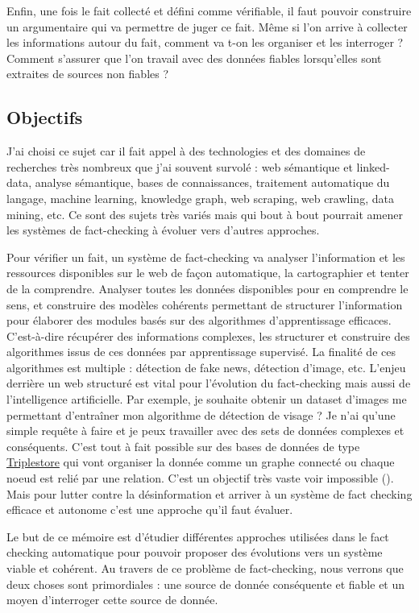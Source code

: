 Enfin, une fois le fait collecté et défini comme vérifiable, il faut pouvoir construire un argumentaire qui va permettre de juger ce fait. Même si l'on arrive à collecter les informations autour du fait, comment va t-on les organiser et les interroger ? Comment s'assurer que l'on travail avec des données fiables lorsqu'elles sont extraites de sources non fiables ? 

\subsection{Objectifs}

J'ai choisi ce sujet car il fait appel à des technologies et des domaines de recherches très nombreux que j'ai souvent survolé : web sémantique et linked-data, analyse sémantique, bases de connaissances, traitement automatique du langage, machine learning, knowledge graph, web scraping, web crawling, data mining, etc. Ce sont des sujets très variés mais qui bout à bout pourrait amener les systèmes de fact-checking à évoluer vers d'autres approches. 

Pour vérifier un fait, un système de fact-checking va analyser l'information et les ressources disponibles sur le web de façon automatique, la cartographier et tenter de la comprendre. Analyser toutes les données disponibles pour en comprendre le sens, et construire des modèles cohérents permettant de structurer l'information pour élaborer des modules basés sur des algorithmes d'apprentissage efficaces. C'est-à-dire récupérer des informations complexes, les structurer et construire des algorithmes issus de ces données par apprentissage supervisé. La finalité de ces algorithmes est multiple : détection de fake news, détection d'image, etc. L'enjeu derrière un web structuré est vital pour l'évolution du fact-checking mais aussi de l'intelligence artificielle. Par exemple, je souhaite obtenir un dataset d'images me permettant d'entraîner mon algorithme de détection de visage ? Je n'ai qu'une simple requête à faire et je peux travailler avec des sets de données complexes et conséquents. C'est tout à fait possible sur des bases de données de type \href{https://fr.wikipedia.org/wiki/Triplestore}{Triplestore} \cite{wiki:Triplestore} qui vont organiser la donnée comme un graphe connecté ou chaque noeud est relié par une relation. C'est un objectif très vaste voir impossible (). Mais pour lutter contre la désinformation et arriver à un système de fact checking efficace et autonome c'est une approche qu'il faut évaluer.

Le but de ce mémoire est d'étudier différentes approches utilisées dans le fact checking automatique pour pouvoir proposer des évolutions vers un système viable et cohérent. Au travers de ce problème de fact-checking, nous verrons que deux choses sont primordiales : une source de donnée conséquente et fiable et un moyen d'interroger cette source de donnée.